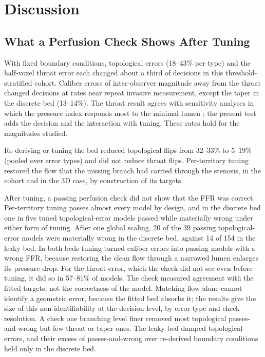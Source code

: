 \documentclass[journal,twoside,web]{ieeecolor}
\begin{document}
\section{Discussion}
\subsection{What a Perfusion Check Shows After Tuning}
With fixed boundary conditions, topological errors (18--43\% per type) and the half-voxel throat error each changed about a third of decisions in this threshold-stratified cohort. Caliber errors of inter-observer magnitude away from the throat changed decisions at rates near repeat invasive measurement, except the taper in the discrete bed (13--14\%). The throat result agrees with sensitivity analyses in which the pressure index responds most to the minimal lumen \cite{sankaran2015tmi,fernandez2024}; the present test adds the decision and the interaction with tuning. These rates hold for the magnitudes studied.

Re-deriving or tuning the bed reduced topological flips from 32--33\% to 5--19\% (pooled over error types) and did not reduce throat flips. Per-territory
tuning restored the flow that the missing branch had carried through the stenosis, in the cohort and in the 3D case, by construction of its targets.

After tuning, a passing perfusion check did not show that the FFR was correct. Per-territory tuning passes
almost every model by design, and in the discrete bed one in five tuned topological-error models passed while
materially wrong under either form of tuning. After one global scaling, 20 of the 39 passing topological-error models were materially wrong in the discrete bed, against 14 of 154 in the leaky bed. In both beds tuning turned caliber errors into passing models with a wrong FFR, because restoring the clean flow through a narrowed lumen enlarges its pressure drop. For the throat error, which the check did not see even before tuning, it did so in 57--81\% of models. The check measured agreement with the fitted targets, not the correctness of the model. Matching flow alone cannot
identify a geometric error, because the fitted bed absorbs it; the results give the size of this non-identifiability at the decision level, by error type and check resolution. A check one
branching level finer removed most topological passes-and-wrong but few throat or taper ones. The leaky
bed damped topological errors, and their excess of passes-and-wrong over re-derived boundary conditions held only in
the discrete bed.
\end{document}
